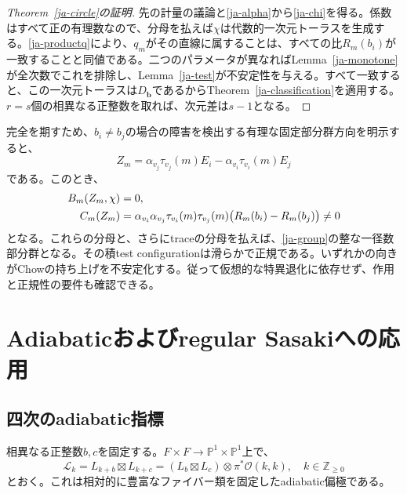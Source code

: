 \documentclass[12pt]{amsart}
\theoremstyle{definition}
\theoremstyle{remark}
\numberwithin{equation}{section}
\newcommand{\cO}{\mathcal{O}}
\newcommand{\Z}{\mathbb{Z}}
\newcommand{\mP}{\mathbb{P}}
\begin{document}
\begin{proof}[Theorem~\ref{ja-circle}の証明]
先の計量の議論と\eqref{ja-alpha}から\eqref{ja-chi}を得る。係数はすべて正の有理数なので、分母を払えば$\chi$は代数的一次元トーラスを生成する。\eqref{ja-productq}により、$q_m$がその直線に属することは、すべての比$R_m(b_i)$が一致することと同値である。二つのパラメータが異なればLemma~\ref{ja-monotone}が全次数でこれを排除し、Lemma~\ref{ja-test}が不安定性を与える。すべて一致すると、この一次元トーラスは$D_{\boldsymbol b}$であるからTheorem~\ref{ja-classification}を適用する。$r=s$個の相異なる正整数を取れば、次元差は$s-1$となる。
\end{proof}

完全を期すため、$b_i\ne b_j$の場合の障害を検出する有理な固定部分群方向を明示すると、
\begin{equation}\label{ja-Z}
 Z_m=\alpha_{v_j}\tau_{v_j}(m)E_i-
       \alpha_{v_i}\tau_{v_i}(m)E_j
\end{equation}
である。このとき、
\begin{align}\label{ja-obstruction}
 B_m(Z_m,\chi)&=0,\\
 C_m(Z_m)&=\alpha_{v_i}\alpha_{v_j}
 \tau_{v_i}(m)\tau_{v_j}(m)
 \bigl(R_m(b_i)-R_m(b_j)\bigr)\ne0\notag
\end{align}
となる。これらの分母と、さらにtraceの分母を払えば、\eqref{ja-group}の整な一径数部分群となる。その積test configurationは滑らかで正規である。いずれかの向きがChowの持ち上げを不安定化する。従って仮想的な特異退化に依存せず、作用と正規性の要件も確認できる。

\section{Adiabaticおよびregular Sasakiへの応用}

\subsection{四次のadiabatic指標}
相異なる正整数$b,c$を固定する。$F\times F\to\mP^1\times\mP^1$上で、
\begin{equation}\label{ja-adiabatic}
 \mathcal L_k=L_{k+b}\boxtimes L_{k+c}
 =(L_b\boxtimes L_c)\otimes\pi^*\cO(k,k),\quad k\in\Z_{\geq0}
\end{equation}
とおく。これは相対的に豊富なファイバー類を固定したadiabatic偏極である。
\end{document}
